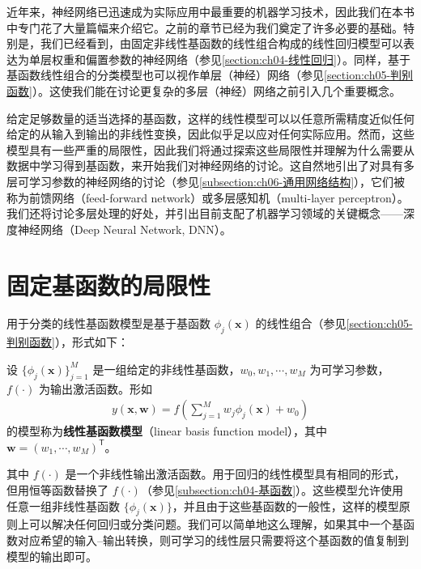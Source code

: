 \documentclass[../../main.tex]{subfiles}
\begin{document}
近年来，神经网络已迅速成为实际应用中最重要的机器学习技术，因此我们在本书中专门花了大量篇幅来介绍它。之前的章节已经为我们奠定了许多必要的基础。特别是，我们已经看到，由固定非线性基函数的线性组合构成的线性回归模型可以表达为单层权重和偏置参数的神经网络（参见\cref{section:ch04-线性回归}）。同样，基于基函数线性组合的分类模型也可以视作单层（神经）网络（参见\cref{section:ch05-判别函数}）。这使我们能在讨论更复杂的多层（神经）网络之前引入几个重要概念。

给定足够数量的适当选择的基函数，这样的线性模型可以以任意所需精度近似任何给定的从输入到输出的非线性变换，因此似乎足以应对任何实际应用。然而，这些模型具有一些严重的局限性，因此我们将通过探索这些局限性并理解为什么需要从数据中学习得到基函数，来开始我们对神经网络的讨论。这自然地引出了对具有多层可学习参数的神经网络的讨论（参见\cref{subsection:ch06-通用网络结构}），它们被称为前馈网络（feed-forward network）或多层感知机（multi-layer perceptron）。我们还将讨论多层处理的好处，并引出目前支配了机器学习领域的关键概念——深度神经网络（Deep Neural Network, DNN）。

\section{固定基函数的局限性}\label{section:ch06-固定基函数的局限性}

用于分类的线性基函数模型是基于基函数 $\phi_j(\boldsymbol{x})$ 的线性组合（参见\cref{section:ch05-判别函数}），形式如下：

\begin{definition}[线性基函数模型]\label{definition:ch06-线性基函数模型}
设 $\{\phi_j(\boldsymbol{x})\}_{j=1}^{M}$ 是一组给定的非线性基函数，$w_0,w_1,\cdots,w_M$ 为可学习参数，$f(\cdot)$ 为输出激活函数。形如
\begin{align}
y(\boldsymbol{x},\boldsymbol{w})=f\!\left(\sum_{j=1}^{M}w_j\phi_j(\boldsymbol{x})+w_0\right)
\label{align:ch06-线性基函数}
\end{align}
的模型称为\textbf{线性基函数模型}（linear basis function model），其中 $\boldsymbol{w}=(w_1,\cdots,w_M)^{\mathsf T}$。
\end{definition}

其中 $f(\cdot)$ 是一个非线性输出激活函数。用于回归的线性模型具有相同的形式，但用恒等函数替换了 $f(\cdot)$（参见\cref{subsection:ch04-基函数}）。这些模型允许使用任意一组非线性基函数 $\{\phi_j(\boldsymbol{x})\}$，并且由于这些基函数的一般性，这样的模型原则上可以解决任何回归或分类问题。我们可以简单地这么理解，如果其中一个基函数对应希望的输入--输出转换，则可学习的线性层只需要将这个基函数的值复制到模型的输出即可。
\end{document}
